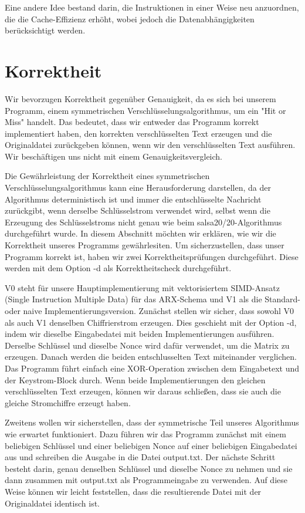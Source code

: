 \documentclass[course=erap]{aspdoc}
\begin{document}
{{{{{{{{{{{{{{{{{Eine andere Idee bestand darin, die Instruktionen in einer Weise neu anzuordnen, die die Cache-Effizienz erhöht, wobei jedoch die Datenabhängigkeiten berücksichtigt werden. 



\section{Korrektheit}
Wir bevorzugen Korrektheit gegenüber Genauigkeit, da es sich bei unserem Programm, einem symmetrischen Verschlüsselungsalgorithmus, um ein "Hit or Miss" handelt. Das bedeutet, dass wir entweder das Programm korrekt implementiert haben, den korrekten verschlüsselten Text erzeugen und die Originaldatei zurückgeben können, wenn wir den verschlüsselten Text ausführen. Wir beschäftigen uns nicht mit einem Genauigkeitsvergleich.

Die Gewährleistung der Korrektheit eines symmetrischen Verschlüsselungsalgorithmus kann eine Herausforderung darstellen, da der Algorithmus deterministisch ist und immer die entschlüsselte Nachricht zurückgibt, wenn derselbe Schlüsselstrom verwendet wird, selbst wenn die Erzeugung des Schlüsselstroms nicht genau wie beim salsa20/20-Algorithmus durchgeführt wurde. In diesem Abschnitt möchten wir erklären, wie wir die Korrektheit unseres Programms gewährlesiten. Um sicherzustellen, dass unser Programm korrekt ist, haben wir zwei Korrektheitsprüfungen durchgeführt. Diese werden mit dem Option -d als Korrektheitscheck durchgeführt. 

V0 steht für unsere Hauptimplementierung mit vektorisiertem SIMD-Ansatz (Single Instruction Multiple Data) für das ARX-Schema und V1 als die Standard- oder naive Implementierungsversion. Zunächst stellen wir sicher, dass sowohl V0 als auch V1 denselben Chiffrierstrom erzeugen. Dies geschieht mit der Option -d, indem wir dieselbe Eingabedatei mit beiden Implementierungen ausführen. Derselbe Schlüssel und dieselbe Nonce wird dafür verwendet, um die Matrix zu erzeugen. Danach werden die beiden entschlusselten Text miteinander verglichen. Das Programm führt einfach eine XOR-Operation zwischen dem Eingabetext und der Keystrom-Block durch. Wenn beide Implementierungen den gleichen verschlüsselten Text erzeugen, können wir daraus schließen, dass sie auch die gleiche Stromchiffre erzeugt haben. 

Zweitens wollen wir sicherstellen, dass der symmetrische Teil unseres Algorithmus wie erwartet funktioniert. Dazu führen wir das Programm zunächst mit einem beliebigen Schlüssel und einer beliebigen Nonce auf einer beliebigen Eingabedatei aus und schreiben die Ausgabe in die Datei output.txt. Der nächste Schritt besteht darin, genau denselben Schlüssel und dieselbe Nonce zu nehmen und sie dann zusammen mit output.txt als Programmeingabe zu verwenden. Auf diese Weise können wir leicht feststellen, dass die resultierende Datei mit der Originaldatei identisch ist. 

}}}}}}}}}}}}}}}}}
\end{document}
